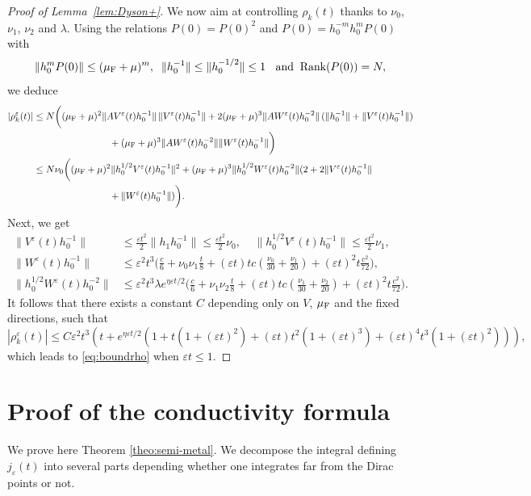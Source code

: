 \documentclass[a4paper,11pt]{article}
\theoremstyle{plain}
\theoremstyle{remark}
\def\eps{{\varepsilon}}
\begin{document}
\begin{proof}[Proof of Lemma~\ref{lem:Dyson+}]
We now aim at controlling $\rho_k(t)$ thanks to $\nu_0$, $\nu_1$, $\nu_2$ and $\lambda$.
Using the relations
$P(0)=P(0)^2$ and $P(0)=h_0^{-m} h_0^mP(0)$
 with
 $$\|h_0^mP(0)\|\le (\mu_{\rm F}+\mu)^m, \;\;\|h_0^{-1}\| \le \|h_0^{-1/2}\| \le 1\;\;
 \mbox{ and}\;\; \mbox{Rank}(P(0))=N,$$
  we deduce
\begin{align*}
|\rho^\eps_k(t)|& \le  N  \biggl( (\mu_{\rm F}+\mu)^2 \|AV^\eps(t)h_0^{-1}\| \, \|V^\eps(t)h_0^{-1}\| +  2 (\mu_{\rm F}+\mu)^3 \|AW^\eps(t)h_0^{-2}\| \,  (\|h_0^{-1}\|+\|V^\eps(t)h_0^{-1}\| )
\\ & \qquad\qquad\qquad\qquad +  (\mu_{\rm F}+\mu)^3  \|AW^\eps(t)h_0^{-2}\| \|W^\eps(t)h_0^{-1}\|   \biggr) \\
& \le  N \nu_0 \biggl(   (\mu_{\rm F}+\mu)^2  \|h_0^{1/2}V^\eps(t)h_0^{-1}\|^2 +  (\mu_{\rm F}+\mu)^3  \|h_0^{1/2}W^\eps(t)h_0^{-2}\|  (2+ 2\|V^\eps(t)h_0^{-1}\|\\
&\qquad\qquad\qquad\qquad
+  \|W^\eps(t)h_0^{-1}\|) \bigg).
\end{align*}
Next, we get
\begin{align*}
\|V^\eps(t)h_0^{-1}\| &\le \frac{\eps t^2}2 \|h_1 h_0^{-1}\| \le \frac{\eps t^2}2 \nu_0, \;\;\;\;
\|h_0^{1/2}V^\eps(t)h_0^{-1}\|  \le \frac{\eps t^2}2 \nu_1, \\
\|W^\eps(t)h_0^{-1}\| & \le \eps^2 t^3 \bigg( \frac{c}6 + \nu_0\nu_1 \frac{t}8 + (\eps t) t c\left( \frac{\nu_0}{30}+\frac{\nu_1}{20} \right) + (\eps t)^2 t \frac{c^2}{72}   \bigg), \\
\|h_0^{1/2}W^\eps(t)h_0^{-2}\| & \le \eps^2 t^3 \lambda e^{\eta \eps t/2} \bigg( \frac{c}6 + \nu_1\nu_2 \frac{t}8 + (\eps t) t c\left( \frac {\nu_1}{30}+\frac{\nu_2}{20} \right) + (\eps t)^2 t \frac{c^2}{72} \bigg).
\end{align*}
 It follows that there exists a constant $C$ depending only on $V$, $\mu_{\rm F}$ and the fixed directions, such that
$$
|\rho^\eps_k(t)| \le C \eps^2 t^3 \left( t+e^{\eta \eps t/2} \left(1 + t (1+(\eps t)^2) + (\eps t) t^2 (1+(\eps t)^3) + (\eps t)^4 t^3 (1+(\eps t)^2) \right)  \right),
$$
which leads to \eqref{eq:boundrho} when $\eps t \le 1$.
\end{proof}


\section{Proof of the conductivity formula}\label{sec:semimet}


We prove here Theorem \ref{theo:semi-metal}. We decompose the integral
defining~$j_\eps(t)$ into several parts depending
whether one integrates far from the Dirac points or not.
\end{document}
